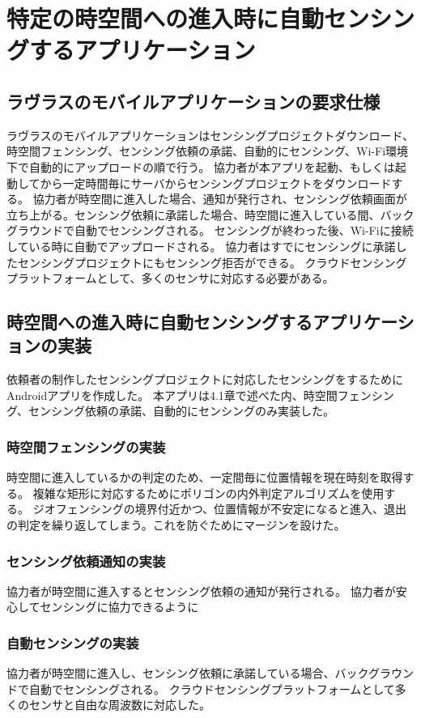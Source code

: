 \chapter{特定の時空間への進入時に自動センシングするアプリケーション}
\thispagestyle{myheadings}

\section{ラヴラスのモバイルアプリケーションの要求仕様}
ラヴラスのモバイルアプリケーションはセンシングプロジェクトダウンロード、時空間フェンシング、センシング依頼の承諾、自動的にセンシング、Wi-Fi環境下で自動的にアップロードの順で行う。
協力者が本アプリを起動、もしくは起動してから一定時間毎にサーバからセンシングプロジェクトをダウンロードする。
協力者が時空間に進入した場合、通知が発行され、センシング依頼画面が立ち上がる。センシング依頼に承諾した場合、時空間に進入している間、バックグラウンドで自動でセンシングされる。
センシングが終わった後、Wi-Fiに接続している時に自動でアップロードされる。
協力者はすでにセンシングに承諾したセンシングプロジェクトにもセンシング拒否ができる。
クラウドセンシングプラットフォームとして、多くのセンサに対応する必要がある。

\section{時空間への進入時に自動センシングするアプリケーションの実装}
依頼者の制作したセンシングプロジェクトに対応したセンシングをするためにAndroidアプリを作成した。
本アプリは4.1章で述べた内、時空間フェンシング、センシング依頼の承諾、自動的にセンシングのみ実装した。
\subsection{時空間フェンシングの実装}
時空間に進入しているかの判定のため、一定間毎に位置情報を現在時刻を取得する。
複雑な矩形に対応するためにポリゴンの内外判定アルゴリズムを使用する。
ジオフェンシングの境界付近かつ、位置情報が不安定になると進入、退出の判定を繰り返してしまう。これを防ぐためにマージンを設けた。

\subsection{センシング依頼通知の実装}
協力者が時空間に進入するとセンシング依頼の通知が発行される。
協力者が安心してセンシングに協力できるように

\subsection{自動センシングの実装}
協力者が時空間に進入し、センシング依頼に承諾している場合、バックグラウンドで自動でセンシングされる。
クラウドセンシングプラットフォームとして多くのセンサと自由な周波数に対応した。


